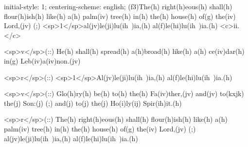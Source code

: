 initial-style: 1;
centering-scheme: english;
(f3)The(h) right(h)eous(h) shall(h) flour(h)ish(h) like(h) a(h) palm(iv) tree(h) in(h) the(h) house(h) of(g) the(iv) Lord,(jv) (;) <sp>1</sp>al(jv)le(ji)lu(ih~)ia,(h) al(f)le(hi)lu(ih~)ia.(h) <c>ii.</c>

<sp>v</sp>(::) He(h) shall(h) spread(h) a(h)broad(h) like(h) a(h) ce(iv)dar(h) in(g) Leb(iv)a(iv)non.(jv)

<sp>r</sp>(::) <sp>1</sp>Al(jv)le(ji)lu(ih~)ia,(h) al(f)le(hi)lu(ih~)ia.(h)

<sp>v</sp>(::) Glo(h)ry(h) be(h) to(h) the(h) Fa(iv)ther,(jv) and(jv) to(kxjk) the(j) Son:(j) (;) and(j) to(j) the(j) Ho(i)ly(ij) Spir(ih)it.(h)

<sp>r</sp>(::) The(h) right(h)eous(h) shall(h) flour(h)ish(h) like(h) a(h) palm(iv) tree(h) in(h) the(h) house(h) of(g) the(iv) Lord,(jv) (;) al(jv)le(ji)lu(ih~)ia,(h) al(f)le(hi)lu(ih~)ia.(h)